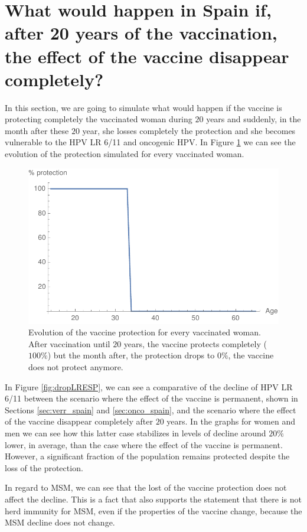 \section{What would happen in Spain if, after 20 years of the vaccination, the effect of the vaccine disappear completely?}
In this section, we are going to simulate what would happen if the vaccine is protecting completely the vaccinated woman during $20$ years and suddenly, in the month after these $20$ year, she losses completely the protection and she becomes vulnerable to the HPV LR 6/11 and oncogenic HPV. In Figure \ref{fig:perdida_proteccion} we can see the evolution of the protection simulated for every vaccinated woman.

\begin{figure}[h!]
	\centering
	\includegraphics[width=0.5\linewidth]{IMGs/6.-Caida_brusca/grafica_perdida_proteccion.pdf}
	\caption{Evolution of the vaccine protection for every vaccinated woman. After vaccination until $20$ years, the vaccine protects completely ($100\%$) but the month after, the protection drops to $0\%$, the vaccine does not protect anymore.}
	\label{fig:perdida_proteccion}
\end{figure}

In Figure \ref{fig:dropLRESP}, we can see a comparative of the decline of HPV LR 6/11 between the scenario where the effect of the vaccine is permanent, shown in Sections \ref{sec:verr_spain} and \ref{sec:onco_spain}, and the scenario where the effect of the vaccine disappear completely after $20$ years. In the graphs for women and men we can see how this latter case stabilizes in levels of decline around $20\%$ lower, in average, than the case where the effect of the vaccine is permanent. However, a significant fraction of the population remains protected despite the loss of the protection. 

In regard to MSM, we can see that the lost of the vaccine protection does not affect the decline. This is a fact that also supports the statement that there is not herd immunity for MSM, even if the properties of the vaccine change, because the MSM decline does not change.

